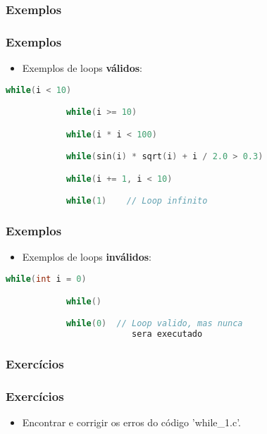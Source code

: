 \subsubsection{Exemplos}

\begin{frame}[fragile]
    \frametitle{Exemplos}
    
        \begin{itemize}
            
            \item Exemplos de loops \textbf{válidos}:
    
        \end{itemize}
    
        \begin{lstlisting}[language=C]
            while(i < 10)

            while(i >= 10)

            while(i * i < 100)

            while(sin(i) * sqrt(i) + i / 2.0 > 0.3)

            while(i += 1, i < 10)

            while(1)    // Loop infinito
        \end{lstlisting}
    
\end{frame}






\begin{frame}[fragile]
    \frametitle{Exemplos}
    
        \begin{itemize}
            
            \item Exemplos de loops \textbf{inválidos}:
    
        \end{itemize}
    
        \begin{lstlisting}[language=C]
            while(int i = 0)

            while()

            while(0)  // Loop valido, mas nunca 
                         sera executado
        \end{lstlisting}
    
\end{frame}





\subsubsection{Exercícios}

\begin{frame}[fragile]
\frametitle{Exercícios}
    
    \begin{itemize}
        
        \item Encontrar e corrigir os erros do código 'while\_1.c'.

    \end{itemize}
    
\end{frame}